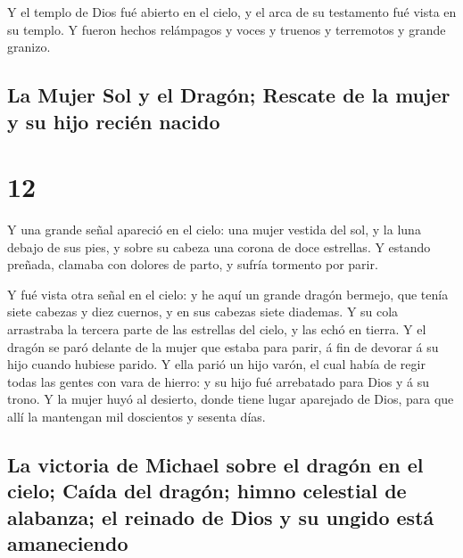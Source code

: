  Y el templo de Dios fué abierto en el cielo, y el arca
de su testamento fué vista en su templo. Y fueron hechos relámpagos y
voces y truenos y terremotos y grande granizo.

\hypertarget{la-mujer-sol-y-el-draguxf3n-rescate-de-la-mujer-y-su-hijo-reciuxe9n-nacido}{%
\subsection{La Mujer Sol y el Dragón; Rescate de la mujer y su hijo
recién
nacido}\label{la-mujer-sol-y-el-draguxf3n-rescate-de-la-mujer-y-su-hijo-reciuxe9n-nacido}}

\hypertarget{section-11}{%
\section{12}\label{section-11}}

 Y una grande señal apareció en el cielo: una mujer
vestida del sol, y la luna debajo de sus pies, y sobre su cabeza una
corona de doce estrellas.  Y estando preñada, clamaba con
dolores de parto, y sufría tormento por parir.

 Y fué vista otra señal en el cielo: y he aquí un grande
dragón bermejo, que tenía siete cabezas y diez cuernos, y en sus cabezas
siete diademas.  Y su cola arrastraba la tercera parte de
las estrellas del cielo, y las echó en tierra. Y el dragón se paró
delante de la mujer que estaba para parir, á fin de devorar á su hijo
cuando hubiese parido.  Y ella parió un hijo varón, el
cual había de regir todas las gentes con vara de hierro: y su hijo fué
arrebatado para Dios y á su trono.  Y la mujer huyó al
desierto, donde tiene lugar aparejado de Dios, para que allí la
mantengan mil doscientos y sesenta días.

\hypertarget{la-victoria-de-michael-sobre-el-draguxf3n-en-el-cielo-cauxedda-del-draguxf3n-himno-celestial-de-alabanza-el-reinado-de-dios-y-su-ungido-estuxe1-amaneciendo}{%
\subsection{La victoria de Michael sobre el dragón en el cielo; Caída
del dragón; himno celestial de alabanza; el reinado de Dios y su ungido
está
amaneciendo}\label{la-victoria-de-michael-sobre-el-draguxf3n-en-el-cielo-cauxedda-del-draguxf3n-himno-celestial-de-alabanza-el-reinado-de-dios-y-su-ungido-estuxe1-amaneciendo}}


